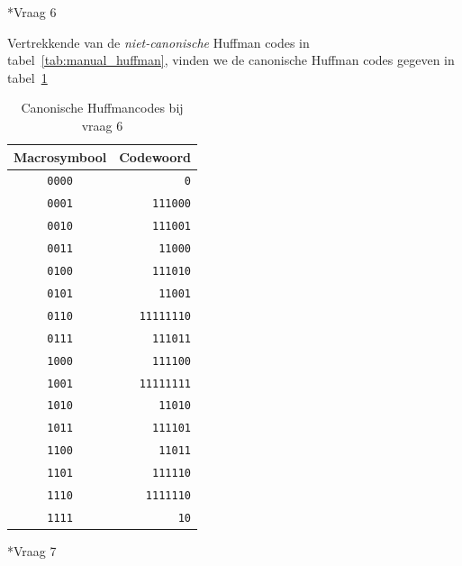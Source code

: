 \documentclass[]{article}
\begin{document}
\begin{section}
    \begin{subsection}*{Vraag 6}
    	
    	Vertrekkende van de \emph{niet-canonische} Huffman codes in 
    	tabel~\ref{tab:manual_huffman}, vinden we de canonische
    	Huffman codes gegeven in tabel~\ref{tab:canonical_huffman}
    	
    	\begin{table}
            \centering
            \begin{tabular}{c|r}
                \textbf{Macrosymbool} &
                \textbf{Codewoord} \\
                \hline
                \texttt{0000} & \texttt{0} \\
				\texttt{0001} & \texttt{111000} \\
				\texttt{0010} & \texttt{111001} \\
				\texttt{0011} & \texttt{11000} \\
				\texttt{0100} & \texttt{111010} \\
				\texttt{0101} & \texttt{11001} \\
				\texttt{0110} & \texttt{11111110} \\
				\texttt{0111} & \texttt{111011} \\
				\texttt{1000} & \texttt{111100} \\
				\texttt{1001} & \texttt{11111111} \\
				\texttt{1010} & \texttt{11010} \\
				\texttt{1011} & \texttt{111101} \\
				\texttt{1100} & \texttt{11011} \\
				\texttt{1101} & \texttt{111110} \\
				\texttt{1110} & \texttt{1111110} \\
				\texttt{1111} & \texttt{10} \\
            \end{tabular}
            \caption{Canonische Huffmancodes bij vraag 6}
            \label{tab:canonical_huffman}
        \end{table}
    	
    \end{subsection}

    \begin{subsection}*{Vraag 7}


   	\end{subsection}

\end{section}
\end{document}
